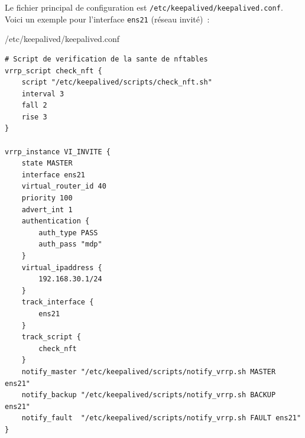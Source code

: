 \documentclass{article}
\begin{document}

Le fichier principal de configuration est \texttt{/etc/keepalived/keepalived.conf}. Voici un exemple pour l'interface \texttt{ens21} (réseau invité)~:

\begin{configbox}{/etc/keepalived/keepalived.conf}
\begin{lstlisting}
# Script de verification de la sante de nftables
vrrp_script check_nft {
    script "/etc/keepalived/scripts/check_nft.sh"
    interval 3
    fall 2
    rise 3
}

vrrp_instance VI_INVITE {
    state MASTER
    interface ens21
    virtual_router_id 40
    priority 100
    advert_int 1
    authentication {
        auth_type PASS
        auth_pass "mdp"
    }
    virtual_ipaddress {
        192.168.30.1/24
    }
    track_interface {
        ens21
    }
    track_script {
        check_nft
    }
    notify_master "/etc/keepalived/scripts/notify_vrrp.sh MASTER ens21"
    notify_backup "/etc/keepalived/scripts/notify_vrrp.sh BACKUP ens21"
    notify_fault  "/etc/keepalived/scripts/notify_vrrp.sh FAULT ens21"
}
\end{lstlisting}
\end{configbox}
\end{document}
